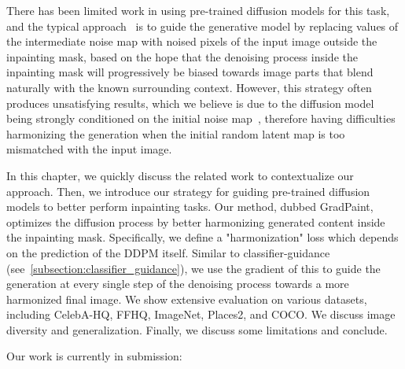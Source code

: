    There has been limited work in using pre-trained diffusion models for this task, and 
the typical approach~\citep{lugmayr2022repaint, meng2022sdedit, nichol2021glide} is to guide the generative 
model by replacing values of the intermediate noise map with noised pixels of the input 
image outside the inpainting mask, based on the hope that the denoising process inside 
the inpainting mask will progressively be biased towards image parts that blend 
naturally with the known surrounding context.
However, this strategy often produces unsatisfying results, which we believe is due to
 the diffusion model being strongly conditioned on the initial noise
  map~\citep{optimaltransport}, therefore having difficulties harmonizing the generation
   when the initial random latent map is too mismatched with the input image.


In this chapter, we quickly discuss the related work to contextualize our approach. 
Then, we introduce our strategy for guiding  pre-trained diffusion models
to better perform inpainting tasks. Our method, dubbed GradPaint, optimizes the
diffusion process by better harmonizing generated content inside the inpainting mask.
Specifically, we define a "harmonization" loss which depends on the prediction of the \ac{DDPM}
itself. Similar to classifier-guidance (see~\ref{subsection:classifier_guidance}), 
we use the gradient of this to  guide the generation at every single step of the denoising process towards a
more harmonized final image. We show extensive evaluation on various datasets, 
including  CelebA-HQ\citep{karras2018progressive}, FFHQ\citep{karra2019stylegan}, ImageNet\citep{deng2009imagenet},
Places2\citep{zhou2017places}, and COCO\citep{lin2014mscocodataset}. We discuss image diversity 
and generalization. Finally, we discuss some limitations and conclude. 

Our work is currently in submission:





